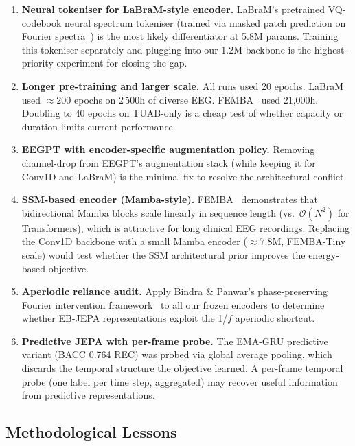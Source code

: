 \documentclass[11pt,a4paper]{article}
\begin{document}
\begin{enumerate}[noitemsep]
  \item \textbf{Neural tokeniser for LaBraM-style encoder.}
    LaBraM's pretrained VQ-codebook neural spectrum tokeniser (trained via masked
    patch prediction on Fourier spectra~\cite{labram}) is the most likely
    differentiator at 5.8M params.  Training this tokeniser separately and plugging
    into our 1.2M backbone is the highest-priority experiment for closing the gap.

  \item \textbf{Longer pre-training and larger scale.}
    All runs used 20 epochs.  LaBraM used $\approx$200 epochs on 2\,500h of diverse
    EEG.  FEMBA~\cite{femba} used 21,000h.  Doubling to 40 epochs on TUAB-only
    is a cheap test of whether capacity or duration limits current performance.

  \item \textbf{EEGPT with encoder-specific augmentation policy.}
    Removing channel-drop from EEGPT's augmentation stack (while keeping it for
    Conv1D and LaBraM) is the minimal fix to resolve the architectural conflict.

  \item \textbf{SSM-based encoder (Mamba-style).}
    FEMBA~\cite{femba} demonstrates that bidirectional Mamba blocks scale linearly
    in sequence length (vs.\ $\mathcal{O}(N^2)$ for Transformers), which is
    attractive for long clinical EEG recordings.  Replacing the Conv1D backbone
    with a small Mamba encoder ($\approx$7.8M, FEMBA-Tiny scale) would test
    whether the SSM architectural prior improves the energy-based objective.

  \item \textbf{Aperiodic reliance audit.}
    Apply Bindra \& Panwar's phase-preserving Fourier intervention
    framework~\cite{spectral_audit} to all our frozen encoders to determine
    whether EB-JEPA representations exploit the 1/$f$ aperiodic shortcut.

  \item \textbf{Predictive JEPA with per-frame probe.}
    The EMA-GRU predictive variant (BACC 0.764 REC) was probed via global
    average pooling, which discards the temporal structure the objective learned.
    A per-frame temporal probe (one label per time step, aggregated) may recover
    useful information from predictive representations.
\end{enumerate}

\subsection{Methodological Lessons}
\end{document}
